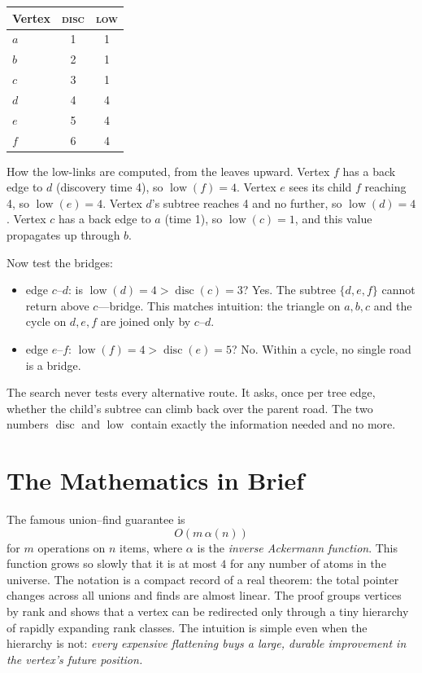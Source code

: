 \begin{center}
\begin{tabular}{lcc}
\toprule
Vertex & \textsc{disc} & \textsc{low} \\
\midrule
$a$ & 1 & 1 \\
$b$ & 2 & 1 \\
$c$ & 3 & 1 \\
$d$ & 4 & 4 \\
$e$ & 5 & 4 \\
$f$ & 6 & 4 \\
\bottomrule
\end{tabular}
\end{center}

How the low-links are computed, from the leaves upward. Vertex $f$ has a back edge to $d$ (discovery time 4), so $\operatorname{low}(f)=4$. Vertex $e$ sees its child $f$ reaching 4, so $\operatorname{low}(e)=4$. Vertex $d$'s subtree reaches 4 and no further, so $\operatorname{low}(d)=4$. Vertex $c$ has a back edge to $a$ (time 1), so $\operatorname{low}(c)=1$, and this value propagates up through $b$.

Now test the bridges:
\begin{itemize}
\item edge $c$--$d$: is $\operatorname{low}(d)=4>\operatorname{disc}(c)=3$? Yes. The subtree $\{d,e,f\}$ cannot return above $c$---bridge. This matches intuition: the triangle on $a,b,c$ and the cycle on $d,e,f$ are joined only by $c$--$d$.
\item edge $e$--$f$: $\operatorname{low}(f)=4>\operatorname{disc}(e)=5$? No. Within a cycle, no single road is a bridge.
\end{itemize}
The search never tests every alternative route. It asks, once per tree edge, whether the child's subtree can climb back over the parent road. The two numbers $\operatorname{disc}$ and $\operatorname{low}$ contain exactly the information needed and no more.

\section{The Mathematics in Brief}
The famous union--find guarantee is
\[
O(m\,\alpha(n))
\]
for $m$ operations on $n$ items, where $\alpha$ is the \emph{inverse Ackermann function}. This function grows so slowly that it is at most $4$ for any number of atoms in the universe. The notation is a compact record of a real theorem: the total pointer changes across all unions and finds are almost linear. The proof groups vertices by rank and shows that a vertex can be redirected only through a tiny hierarchy of rapidly expanding rank classes. The intuition is simple even when the hierarchy is not: \emph{every expensive flattening buys a large, durable improvement in the vertex's future position.}


